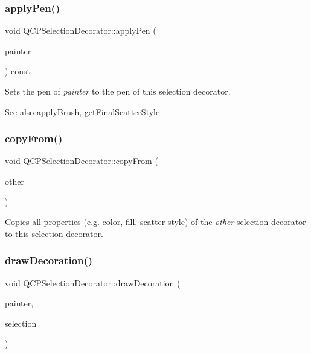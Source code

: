 \subsubsection{\texorpdfstring{apply\+Pen()}{applyPen()}}
{\footnotesize\ttfamily void Q\+C\+P\+Selection\+Decorator\+::apply\+Pen (\begin{DoxyParamCaption}\item[{\mbox{\hyperlink{class_q_c_p_painter}{Q\+C\+P\+Painter}} $\ast$}]{painter }\end{DoxyParamCaption}) const}

Sets the pen of {\itshape painter} to the pen of this selection decorator.

\begin{DoxySeeAlso}{See also}
\mbox{\hyperlink{class_q_c_p_selection_decorator_a225544527d51b49546b70d0e6d655a34}{apply\+Brush}}, \mbox{\hyperlink{class_q_c_p_selection_decorator_a1277b373248896bc70e8cc1de96da9fa}{get\+Final\+Scatter\+Style}} 
\end{DoxySeeAlso}
\mbox{\label{class_q_c_p_selection_decorator_a467a8d5cfcab27e862a17c797ac27b8a}} 
\subsubsection{\texorpdfstring{copy\+From()}{copyFrom()}}
{\footnotesize\ttfamily void Q\+C\+P\+Selection\+Decorator\+::copy\+From (\begin{DoxyParamCaption}\item[{const \mbox{\hyperlink{class_q_c_p_selection_decorator}{Q\+C\+P\+Selection\+Decorator}} $\ast$}]{other }\end{DoxyParamCaption})\hspace{0.3cm}{\ttfamily [virtual]}}

Copies all properties (e.\+g. color, fill, scatter style) of the {\itshape other} selection decorator to this selection decorator. \mbox{\label{class_q_c_p_selection_decorator_a4f8eb49e277063845391e803ae23054a}} 
\subsubsection{\texorpdfstring{draw\+Decoration()}{drawDecoration()}}
{\footnotesize\ttfamily void Q\+C\+P\+Selection\+Decorator\+::draw\+Decoration (\begin{DoxyParamCaption}\item[{\mbox{\hyperlink{class_q_c_p_painter}{Q\+C\+P\+Painter}} $\ast$}]{painter,  }\item[{\mbox{\hyperlink{class_q_c_p_data_selection}{Q\+C\+P\+Data\+Selection}}}]{selection }\end{DoxyParamCaption})\hspace{0.3cm}{\ttfamily [virtual]}}

